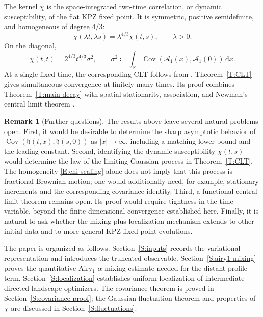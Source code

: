 \documentclass[12pt, reqno]{amsart}
\numberwithin{equation}{section}
\theoremstyle{definition}
\newtheorem{remark}[theorem]{Remark}
\newcommand{\R}{\mathbb{R}}
\newcommand{\h}{\mathfrak{h}}
\newcommand{\Cov}{\operatorname{Cov}}
\newcommand{\dd}{\,\mathrm{d}}
\newcommand{\Acal}{\mathcal{A}}
\begin{document}
The kernel $\chi$ is the space-integrated two-time correlation, or dynamic
susceptibility, of the flat KPZ fixed point. It is symmetric, positive
semidefinite, and homogeneous of degree $4/3$:
\begin{equation}\label{E:chi-scaling}
  \chi(\lambda t,\lambda s)=\lambda^{4/3}\chi(t,s),
  \qquad \lambda>0.
\end{equation}
On the diagonal,
\[
  \chi(t,t)=2^{4/3}t^{4/3}\sigma^2,
  \qquad
  \sigma^2 \coloneqq \int_\R
  \Cov(\Acal_1(x),\Acal_1(0))\dd x.
\]
At a single fixed time, the corresponding CLT follows from
\cite[Theorem~1.1]{pu:23:ergodicity}. Theorem~\ref{T:CLT} gives simultaneous convergence at
finitely many times. Its proof combines Theorem~\ref{T:main-decay} with
spatial stationarity, association, and Newman's central limit theorem
\cite{newman:80:normal}.

\begin{remark}[Further questions]\label{rem:further-questions}
  The results above leave several natural problems open. First, it would be
  desirable to determine the sharp asymptotic behavior of
  $\Cov(\h(t,x),\h(s,0))$ as $|x|\to\infty$, including a matching lower bound
  and the leading constant. Second, identifying the dynamic susceptibility
  $\chi(t,s)$ would determine the law of the limiting Gaussian process in
  Theorem~\ref{T:CLT}. The homogeneity \eqref{E:chi-scaling} alone does not
  imply that this process is fractional Brownian motion; one would additionally
  need, for example, stationary increments and the corresponding covariance
  identity. Third, a functional central limit theorem remains open. Its proof
  would require tightness in the time variable, beyond the finite-dimensional
  convergence established here. Finally, it is natural to ask whether the
  mixing-plus-localization mechanism extends to other initial data and to more
  general KPZ fixed-point evolutions.
\end{remark}

The paper is organized as follows. Section~\ref{S:inputs} records the
variational representation and introduces the truncated observable.
Section~\ref{S:airy1-mixing} proves the quantitative Airy$_1$ $\alpha$-mixing
estimate needed for the distant-profile term. Section~\ref{S:localization}
establishes uniform localization of intermediate directed-landscape optimizers.
The covariance theorem is proved in Section~\ref{S:covariance-proof}; the
Gaussian fluctuation theorem and properties of $\chi$ are discussed in
Section~\ref{S:fluctuations}.
\end{document}
